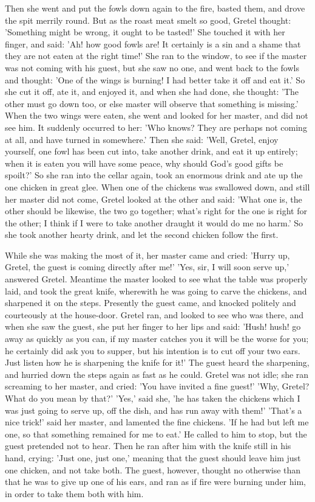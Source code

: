 \documentclass[12pt]{book}
\begin{document}
Then she went and put the fowls down again to the fire, basted them,
and drove the spit merrily round. But as the roast meat smelt so good,
Gretel thought: 'Something might be wrong, it ought to be tasted!' She
touched it with her finger, and said: 'Ah! how good fowls are! It
certainly is a sin and a shame that they are not eaten at the right
time!' She ran to the window, to see if the master was not coming with
his guest, but she saw no one, and went back to the fowls and thought:
'One of the wings is burning! I had better take it off and eat it.' So
she cut it off, ate it, and enjoyed it, and when she had done, she
thought: 'The other must go down too, or else master will observe that
something is missing.' When the two wings were eaten, she went and
looked for her master, and did not see him. It suddenly occurred to
her: 'Who knows? They are perhaps not coming at all, and have turned
in somewhere.' Then she said: 'Well, Gretel, enjoy yourself, one fowl
has been cut into, take another drink, and eat it up entirely; when it
is eaten you will have some peace, why should God's good gifts be
spoilt?' So she ran into the cellar again, took an enormous drink and
ate up the one chicken in great glee. When one of the chickens was
swallowed down, and still her master did not come, Gretel looked at
the other and said: 'What one is, the other should be likewise, the
two go together; what's right for the one is right for the other; I
think if I were to take another draught it would do me no harm.' So
she took another hearty drink, and let the second chicken follow the
first.

While she was making the most of it, her master came and cried: 'Hurry
up, Gretel, the guest is coming directly after me!' 'Yes, sir, I will
soon serve up,' answered Gretel. Meantime the master looked to see
what the table was properly laid, and took the great knife, wherewith
he was going to carve the chickens, and sharpened it on the steps.
Presently the guest came, and knocked politely and courteously at the
house-door. Gretel ran, and looked to see who was there, and when she
saw the guest, she put her finger to her lips and said: 'Hush! hush!
go away as quickly as you can, if my master catches you it will be the
worse for you; he certainly did ask you to supper, but his intention
is to cut off your two ears. Just listen how he is sharpening the
knife for it!' The guest heard the sharpening, and hurried down the
steps again as fast as he could. Gretel was not idle; she ran
screaming to her master, and cried: 'You have invited a fine guest!'
'Why, Gretel? What do you mean by that?' 'Yes,' said she, 'he has
taken the chickens which I was just going to serve up, off the dish,
and has run away with them!' 'That's a nice trick!' said her master,
and lamented the fine chickens. 'If he had but left me one, so that
something remained for me to eat.' He called to him to stop, but the
guest pretended not to hear. Then he ran after him with the knife
still in his hand, crying: 'Just one, just one,' meaning that the
guest should leave him just one chicken, and not take both. The guest,
however, thought no otherwise than that he was to give up one of his
ears, and ran as if fire were burning under him, in order to take them
both with him.
\end{document}
